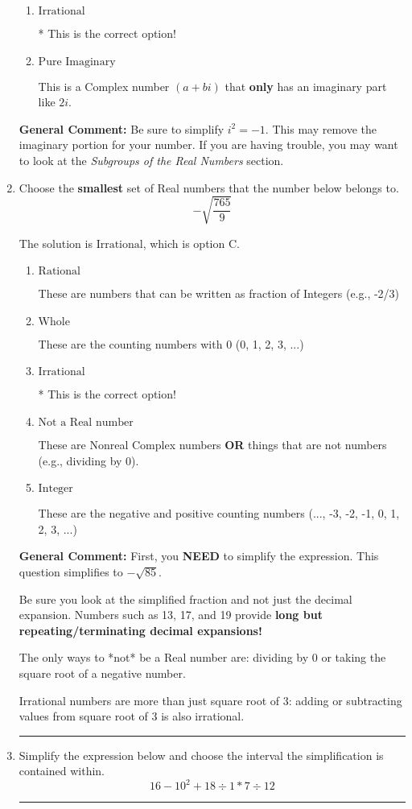 \documentclass{extbook}[14pt]
\newcommand{\litem}[1]{\item #1

\rule{\textwidth}{0.4pt}}
\begin{document}
\begin{enumerate}
{\begin{enumerate}[label=\Alph*.]
These are numbers that can be written as fraction of Integers (e.g., -2/3 + 5)
\item \( \text{Irrational} \)

* This is the correct option!
\item \( \text{Pure Imaginary} \)

This is a Complex number $(a+bi)$ that \textbf{only} has an imaginary part like $2i$.
\end{enumerate}

\textbf{General Comment:} Be sure to simplify $i^2 = -1$. This may remove the imaginary portion for your number. If you are having trouble, you may want to look at the \textit{Subgroups of the Real Numbers} section.
}
\litem{
Choose the \textbf{smallest} set of Real numbers that the number below belongs to.
\[ -\sqrt{\frac{765}{9}} \]

The solution is \( \text{Irrational} \), which is option C.\begin{enumerate}[label=\Alph*.]
\item \( \text{Rational} \)

These are numbers that can be written as fraction of Integers (e.g., -2/3)
\item \( \text{Whole} \)

These are the counting numbers with 0 (0, 1, 2, 3, ...)
\item \( \text{Irrational} \)

* This is the correct option!
\item \( \text{Not a Real number} \)

These are Nonreal Complex numbers \textbf{OR} things that are not numbers (e.g., dividing by 0).
\item \( \text{Integer} \)

These are the negative and positive counting numbers (..., -3, -2, -1, 0, 1, 2, 3, ...)
\end{enumerate}

\textbf{General Comment:} First, you \textbf{NEED} to simplify the expression. This question simplifies to $-\sqrt{85}$. 
 
 Be sure you look at the simplified fraction and not just the decimal expansion. Numbers such as 13, 17, and 19 provide \textbf{long but repeating/terminating decimal expansions!} 
 
 The only ways to *not* be a Real number are: dividing by 0 or taking the square root of a negative number. 
 
 Irrational numbers are more than just square root of 3: adding or subtracting values from square root of 3 is also irrational.
}
\litem{
Simplify the expression below and choose the interval the simplification is contained within.
\[ 16 - 10^2 + 18 \div 1 * 7 \div 12 \]

}
\end{enumerate}
\end{document}
